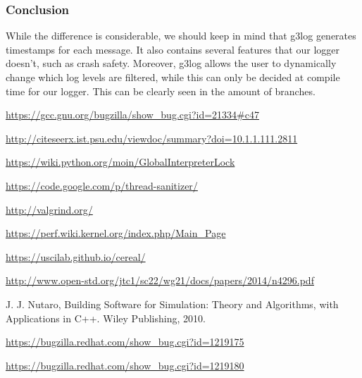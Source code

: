 \documentclass[8pt,a4paper]{report}
\begin{document}
\subsubsection{Conclusion}
While the difference is considerable, we should keep in mind that g3log generates timestamps for each message. It also contains several features that our logger doesn't, such as crash safety. Moreover, g3log allows the user to dynamically change which log levels are filtered, while this can only be decided at compile time for our logger. This can be clearly seen in the amount of branches.

\begin{thebibliography}{1}


   \url{https://gcc.gnu.org/bugzilla/show_bug.cgi?id=21334#c47}

   \url{http://citeseerx.ist.psu.edu/viewdoc/summary?doi=10.1.1.111.2811}
  
   \url{https://wiki.python.org/moin/GlobalInterpreterLock}
  
   \url{https://code.google.com/p/thread-sanitizer/}
  
   \url{http://valgrind.org/}
  
   \url{https://perf.wiki.kernel.org/index.php/Main_Page}
  
   \url{https://uscilab.github.io/cereal/}
  
   \url{http://www.open-std.org/jtc1/sc22/wg21/docs/papers/2014/n4296.pdf}
  
    J. J. Nutaro, Building Software for Simulation: Theory and Algorithms, with
Applications in C++. Wiley Publishing, 2010.

    \url{https://bugzilla.redhat.com/show_bug.cgi?id=1219175}
  
    \url{https://bugzilla.redhat.com/show_bug.cgi?id=1219180}


  \end{thebibliography}
\end{document}
